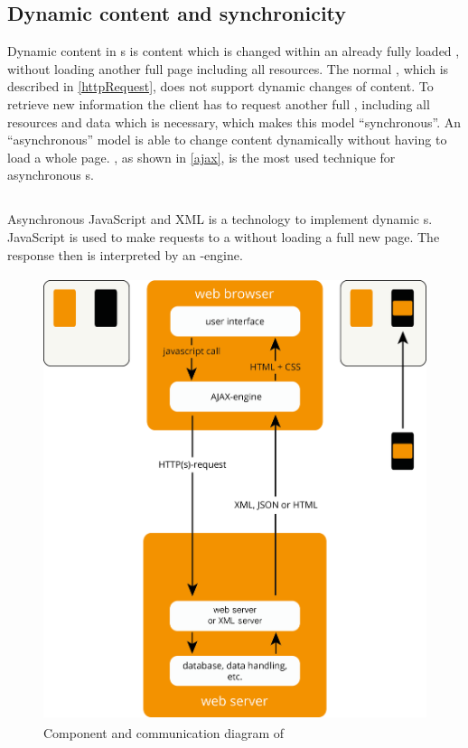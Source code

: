 \subsection{Dynamic content and synchronicity\label{synchronicity}}
Dynamic content in \webSite{}s is content which is changed within an already fully loaded \webPage{}, without loading another full page including all resources. 
The normal \httpRequest{}, which is described in \ref{httpRequest}, does not support dynamic changes of content. 
To retrieve new information the client has to request another full \webPage{}, including all resources and data which is necessary, which makes this model \enquote{synchronous}.
An \enquote{asynchronous} model is able to change content dynamically without having to load a whole page. 
\ajax{}, as shown in \ref{ajax}, is the most used technique for asynchronous \webSite{}s.

\subsection{\ajax{}\label{ajax}}
Asynchronous JavaScript and XML is a technology to implement dynamic \webPage{}s.
JavaScript is used to make requests to a \webServer{} without loading a full new page.
The response then is interpreted by an \ajax{}-engine.
\begin{figure}[H]
\centering
\includegraphics[height=13cm]{images/ajax.png}
\caption[ajax_components]{Component and communication diagram of \ajax{}}
\label{fig:ajax_components}
\end{figure}

